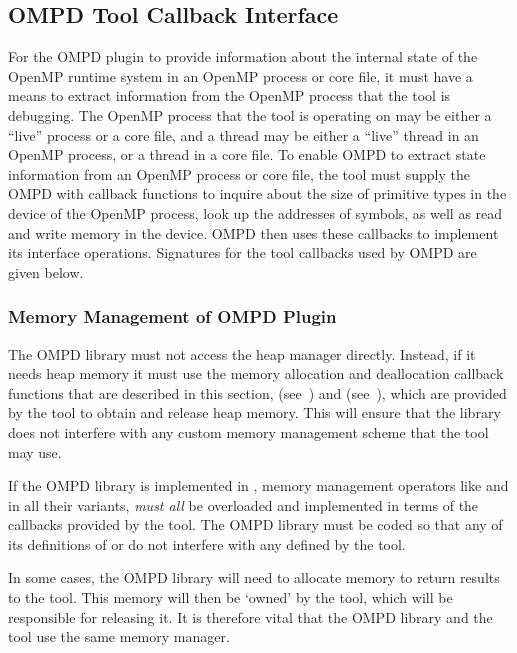 \subsection{OMPD Tool Callback Interface}
\label{subsec:ompd-tool-callback-interface}

For the OMPD plugin to provide information about the internal state
of the OpenMP runtime system in an OpenMP process or core file,
it must have a means to extract information from
the OpenMP process that the tool is debugging.
The OpenMP process that the tool is operating on may be either a ``live'' process or a core file,
and a thread may be either a ``live'' thread in an OpenMP process,
or a thread in a core file.
To enable OMPD to extract state information from an OpenMP process or core file,
the tool must supply the OMPD with callback functions to inquire
about the size of primitive types in the device of the OpenMP process,
look up the addresses of symbols,
as well as read and write memory in the device.
OMPD then uses these callbacks to implement its interface operations.
Signatures for the tool callbacks used by OMPD are given below.

\subsubsection{Memory Management of OMPD Plugin}
The OMPD library must not access the heap manager directly. Instead, if it needs heap memory it
must use the memory allocation and deallocation callback functions that are described in this
section,  (see~)
and 
 (see~),
which are
provided by the tool to obtain and release heap memory. This will ensure that the library does not
interfere with any custom memory management scheme that the tool may use.

If the OMPD library is implemented in , memory management operators like 
and  in all their variants, \emph{must all} be overloaded and implemented in terms of
the callbacks provided by the tool. The OMPD library must be coded so that any of its
definitions of  or  do not interfere with any defined by the tool.

In some cases, the OMPD library will need to allocate memory to return results to the
tool. This memory will then be `owned' by the tool, which will be responsible for releasing it. It is
therefore vital that the OMPD library and the tool use the same memory manager.


